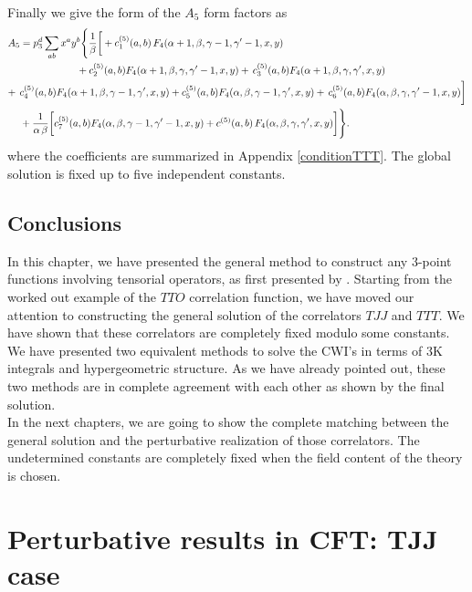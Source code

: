 \documentclass[a4paper,11pt,openright,twoside]{book}
\let\a=\alpha   \let\b=\beta   \let\g=\gamma   \let\d=\delta
\numberwithin{equation}{section}
\begin{document}
{{\begin{align}
\end{align}
Finally we give the form of the $A_5$ form factors as
\begin{align}
A_5&=p_3^{d}\sum_{ab}x^ay^b\Bigg\{\frac{1}{\b}\bigg[+c_1^{(5)}(a,b)\,F_4(\a+1,\b,\g-1,\g'-1,x,y)\notag\\
&\hspace{2cm}+c^{(5)}_2(a,b)F_4(\a+1,\b,\g,\g'-1,x,y)+\,c^{(5)}_3(a,b)F_4(\a+1,\b,\g,\g',x,y)\notag\\
&\hspace{-0.5cm}+\,c^{(5)}_4(a,b)F_4(\a+1,\b,\g-1,\g',x,y)+c^{(5)}_5(a,b)F_4(\a,\b,\g-1,\g',x,y)+\,c^{(5)}_6(a,b)F_4(\a,\b,\g,\g'-1,x,y)\bigg]\notag\\
&+\frac{1}{\a\,\b}\bigg[c^{(5)}_7(a,b)F_4(\a,\b,\g-1,\g'-1,x,y)+c^{(5)}(a,b)\,F_4(\a,\b,\g,\g',x,y)\bigg]\Bigg\}. 
\end{align}
where the coefficients are summarized in Appendix \ref{conditionTTT}. The global solution is fixed up to five independent constants. 

\section{Conclusions}

In this chapter, we have presented the general method to construct any 3-point functions involving tensorial operators, as first presented by \cite{Bzowski:2013sza}. Starting from the worked out example of the $TTO$ correlation function, we have moved our attention to constructing the general solution of the correlators $TJJ$ and $TTT$. We have shown that these correlators are completely fixed modulo some constants. We have presented two equivalent methods to solve the CWI's in terms of $3$K integrals and hypergeometric structure. As we have already pointed out, these two methods are in complete agreement with each other as shown by the final solution.\\
In the next chapters, we are going to show the complete matching between the general solution and the perturbative realization of those correlators. The undetermined constants are completely fixed when the field content of the theory is chosen.\\
\chapter{Perturbative results in CFT: TJJ case}\label{PerturbativeTJJ}

}}
\end{document}
